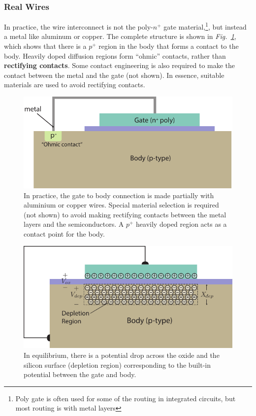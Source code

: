 \subsubsection{Real Wires}
In practice, the wire interconnect is not the poly-$n^+$ gate material,\footnote{Poly gate is often used for some of the routing in integrated circuits, but most routing is with metal layers}, but instead a metal like aluminum or copper.  The complete structure is shown in \emph{Fig.~\ref{fig:mos_cap_gate_body_short_wire}}, which shows that there is a $p^+$ region in the body that forms a contact to the body.  Heavily doped diffusion regions form “ohmic” contacts, rather than \textbf{rectifying contacts}.  Some contact engineering is also required to make the contact between the metal and the gate (not shown). In essence, suitable materials are used to avoid rectifying contacts.  
\begin{figure}[H]
\centering
\includegraphics[width=.75\columnwidth]{mos_cap_metal_short}
\caption{In practice, the gate to body connection is made partially with aluminium or copper wires.  Special material selection is required (not shown) to avoid making rectifying contacts between the metal layers and the semiconductors.  A $p^+$ heavily doped region acts as a contact point for the body.} \label{fig:mos_cap_gate_body_short_wire}
\end{figure}
\newpage
\begin{figure}[t]
\centering
\includegraphics[width=.85\columnwidth]{mos_cap_equilibrium}
\caption{In equilibrium, there is a potential drop across the oxide and the silicon surface (depletion region) corresponding to the built-in potential between the gate and body.}
\label{fig:mos_charge_equil}
\end{figure}
